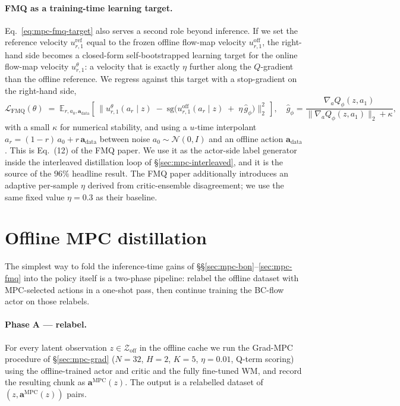 \paragraph{FMQ as a training-time learning target.} Eq.~\eqref{eq:mpc-fmq-target} also serves a second role beyond inference. If we set the reference velocity $u^{\mathrm{ref}}_{r,1}$ equal to the frozen offline flow-map velocity $u^{\text{off}}_{r,1}$, the right-hand side becomes a closed-form self-bootstrapped learning target for the online flow-map velocity $u^\theta_{r,1}$: a velocity that is exactly $\eta$ further along the $Q$-gradient than the offline reference. We regress against this target with a stop-gradient on the right-hand side,
\begin{equation}
    \mathcal{L}_{\text{FMQ}}(\theta) \;=\; \mathbb{E}_{r, a_0, \mathbf{a}_{\text{data}}}\!\left[\,
        \Big\| u^\theta_{r,1}(a_r \mid z) \;-\; \mathrm{sg}\!\Big(u^{\text{off}}_{r,1}(a_r \mid z) \;+\; \eta\,\hat g_\phi\Big) \Big\|_2^2\,\right],
    \quad \hat g_\phi = \frac{\nabla_a Q_\phi(z, a_1)}{\|\nabla_a Q_\phi(z, a_1)\|_2 + \kappa},
    \label{eq:mpc-fmq-loss}
\end{equation}
with a small $\kappa$ for numerical stability, and using a $u$-time interpolant $a_r = (1 - r)\,a_0 + r\,\mathbf{a}_{\text{data}}$ between noise $a_0 \sim \mathcal{N}(0, I)$ and an offline action $\mathbf{a}_{\text{data}}$. This is Eq.~(12) of the FMQ paper. We use it as the actor-side label generator inside the interleaved distillation loop of \S\ref{sec:mpc-interleaved}, and it is the source of the $96\%$ headline result. The FMQ paper additionally introduces an adaptive per-sample $\eta$ derived from critic-ensemble disagreement; we use the same fixed value $\eta = 0.3$ as their baseline.

\section{Offline MPC distillation}
\label{sec:mpc-offline-distill}

The simplest way to fold the inference-time gains of \S\S\ref{sec:mpc-bon}--\ref{sec:mpc-fmq} into the policy itself is a two-phase pipeline: relabel the offline dataset with MPC-selected actions in a one-shot pass, then continue training the BC-flow actor on those relabels.

\paragraph{Phase A --- relabel.} For every latent observation $z \in \mathcal{Z}_{\text{off}}$ in the offline cache we run the Grad-MPC procedure of \S\ref{sec:mpc-grad} ($N = 32$, $H = 2$, $K = 5$, $\eta = 0.01$, Q-term scoring) using the offline-trained actor and critic and the fully fine-tuned WM, and record the resulting chunk as $\mathbf{a}^{\text{MPC}}(z)$. The output is a relabelled dataset of $(z, \mathbf{a}^{\text{MPC}}(z))$ pairs.

